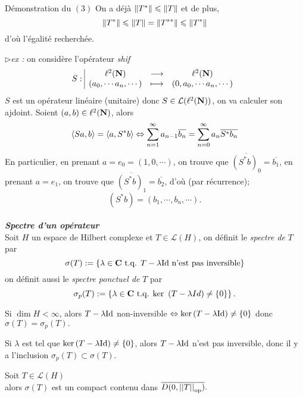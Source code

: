 \documentclass[a4paper,11pt, twoside]{article}
\begin{document}
\begin{ProofC}{Démonstration du $(\mathit 3)$}
  On a déjà $\left\lVert T^*\right\rVert\leqslant \left\lVert T\right\rVert$ et de plus, 
  $$\left\lVert T^*\right\rVert\leqslant \left\lVert T\right\rVert=\left\lVert T^{**}\right\rVert\leqslant \left\lVert T^*\right\rVert$$ 
  d'où l'égalité recherchée.  
\end{ProofC}


$\triangleright$\emph{ex :} on considère l'opérateur \emph{shif}
$$S:\begin{array}{|ccc}
  \ell^2(\mathbf N)&\longrightarrow&\ell^2(\mathbf N)\\
  (a_0,\cdots a_n,\cdots)&\longmapsto&(0,a_0,\cdots a_n,\cdots)
\end{array}$$
$S$ est un opérateur linéaire (unitaire) donc $S\in\mathcal L(\ell^2(\mathbf N))$, on va calculer son ajdoint. Soient $(a,b)\in\ell^2(\mathbf N)$, alors 
$$\left\langle Sa,b \right\rangle=\left\langle a,S^*b \right\rangle\Leftrightarrow\sum_{n=1}^\infty a_{n-1}\overline{b_n}=\sum_{n=0}^\infty a_{n}\overline{S^*b_n}$$
En particulier, en prenant $a=e_0=(1,0,\cdots)$, on trouve que $\overline{(S^*b)_0}=\overline{b_1}$, en prenant $a=e_1$, on trouve que $\overline{(S^*b)_1}=\overline{b_2}$, d'où (par récurrence);
$$(S^*b)=(b_1,\cdots,b_n,\cdots).$$\\



{\bf{\emph{Spectre d'un opérateur}}}\\[2em]



Soit $H$ un espace de Hilbert complexe et $T\in\mathcal L(H)$, on définit le \emph{spectre de }$T$ par 
$$\sigma(T):=\left\{\lambda\in \mathbf C\text{ t.q. } T-\lambda \mathrm{Id}\text{ n'est pas inversible}\right\}$$
on définit aussi le \emph{spectre ponctuel de }$T$ par 
$$\sigma_p(T):=\left\{\lambda\in \mathbf C\text{ t.q. } \mathrm{ker}\ \left(T-\lambda \\Id\right)\neq \left\{0\right\}\right\}.$$



\begin{RQ}
  Si $\dim H<\infty$, alors $T-\lambda \mathrm{Id}$ non-inversible $\Leftrightarrow \mathrm{ker} \left(T-\lambda \mathrm{Id}\right)\neq \left\{0\right\}$ donc $\sigma(T)=\sigma_p(T).$\\
\end{RQ}


\begin{RQ}
  Si $\lambda$ est tel que $\mathrm{ker}\left(T-\lambda \mathrm{Id}\right)\neq \left\{0\right\}$, alors $T-\lambda \mathrm{Id}$ n'est pas inversible, donc il y a l'inclusion $\sigma_p(T)\subset \sigma(T).$\\
\end{RQ}


\begin{prop}
  Soit $T\in\mathcal L(H)$\\

  alors $\sigma(T)$ est un compact contenu dans $\overline{D(0,\left|\left|T\right|\right|_{\mathrm{op}})}.$
\end{prop}
\end{document}
